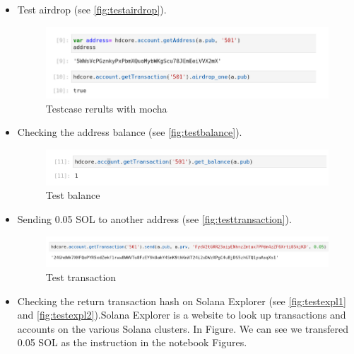 \begin{itemize}
    \item Test airdrop (see \autoref{fig:testairdrop}).
    \begin{figure}[ht!]
        \centering
        \includegraphics[width=1\textwidth]{images/testairdrop.png}
        \caption[Testcase rerults with mocha]{Testcase rerults with mocha}
        \label{fig:testairdrop}
    \end{figure}
    \item Checking the address balance (see \autoref{fig:testbalance}).
    \begin{figure}[ht!]
        \centering
        \includegraphics[width=1\textwidth]{images/testgetbalance.png}
        \caption[Test balance]{Test balance}
        \label{fig:testbalance}
    \end{figure}
    \item Sending 0.05 SOL to another address (see \autoref{fig:testtransaction}).
    \begin{figure}[ht!]
        \centering
        \includegraphics[width=1\textwidth]{images/testtransaction.png}
        \caption[Test transaction]{Test transaction}
        \label{fig:testtransaction}
    \end{figure}
    \item Checking the return transaction hash on Solana Explorer (see \autoref{fig:testexpl1} and \autoref{fig:testexpl2}).Solana Explorer is a website to look up transactions and accounts on the various Solana clusters. In Figure. We can see we transfered 0.05 SOL as the instruction in the notebook Figures.


\end{itemize}
